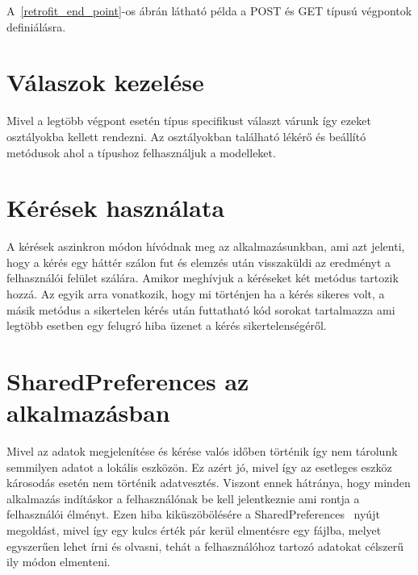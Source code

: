 \documentclass[
]{thesis-ekf}
\theoremstyle{definition}
\theoremstyle{remark}
\begin{document}
	A~\ref{retrofit_end_point}-os ábrán látható példa a POST és GET típusú végpontok definiálásra.
	
	
	
	
	
	\section{Válaszok kezelése}
	Mivel a legtöbb végpont esetén típus specifikust választ várunk így ezeket osztályokba kellett rendezni. Az osztályokban található lékérő és beállító metódusok ahol a típushoz felhasználjuk a modelleket.
	
	\section{Kérések használata}
	A kérések aszinkron módon hívódnak meg az alkalmazásunkban, ami azt jelenti, hogy a kérés egy háttér szálon fut és elemzés után visszaküldi az eredményt a felhasználói felület szálára. Amikor meghívjuk a kéréseket két metódus tartozik hozzá. Az egyik arra vonatkozik, hogy mi történjen ha a kérés sikeres volt, a másik metódus a sikertelen kérés után futtatható kód sorokat tartalmazza ami legtöbb esetben egy felugró hiba üzenet a kérés sikertelenségéről.
	
	\section{SharedPreferences az alkalmazásban}
	Mivel az adatok megjelenítése és kérése valós időben történik így nem tárolunk semmilyen adatot a lokális eszközön. Ez azért jó, mivel így az esetleges eszköz károsodás esetén nem történik adatvesztés. Viszont ennek hátránya, hogy minden alkalmazás indításkor a felhasználónak be kell jelentkeznie ami rontja a felhasználói élményt. Ezen hiba kiküszöbölésére a SharedPreferences~\cite{sharedPref_android} nyújt megoldást, mivel így egy kulcs érték pár kerül elmentésre egy fájlba, melyet egyszerűen lehet írni és olvasni, tehát a felhasználóhoz tartozó adatokat célszerű ily módon elmenteni.
	
\end{document}
